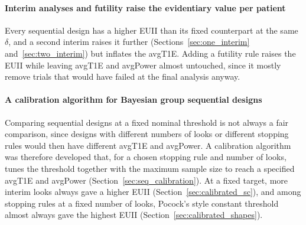 \paragraph{Interim analyses and futility raise the evidentiary value per patient}
Every sequential design has a higher EUII than its fixed counterpart at the same $\delta$, and a second
interim raises it further (Sections~\ref{sec:one_interim} and~\ref{sec:two_interim}) but inflates the avgT1E. 
Adding a futility rule raises the EUII while leaving avgT1E and avgPower almost untouched, since it mostly remove
trials that would have failed at the final analysis anyway.


\paragraph{A calibration algorithm for Bayesian group sequential designs}
Comparing sequential designs at a fixed nominal threshold is not always a fair comparison, since designs 
with different numbers of looks or different stopping rules would then have different avgT1E 
and avgPower. A calibration algorithm was therefore developed that, for a chosen stopping rule 
and number of looks, tunes the threshold together with the maximum sample size to reach a 
specified avgT1E and avgPower (Section~\ref{sec:seq_calibration}).
At a fixed target, more interim looks always gave a higher EUII (Section~\ref{sec:calibrated_sc}), and 
among stopping rules at a fixed number of looks, Pocock's style constant threshold almost always gave the highest EUII (Section~\ref{sec:calibrated_shapes}).




